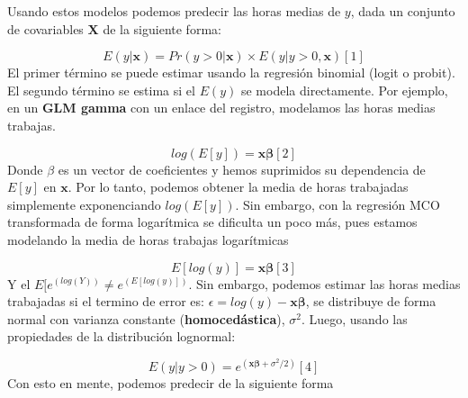 \documentclass[
  letterpaper,
  DIV=11,
  numbers=noendperiod]{scrreprt}
\begin{document}
Usando estos modelos podemos predecir las horas medias de \(y\), dada un
conjunto de covariables \(\mathbf{X}\) de la siguiente forma:

\[E(y|\mathbf{x})=Pr(y>0|\mathbf{x})\times E(y|y>0,\mathbf{x})[1]\] El
primer término se puede estimar usando la regresión binomial (logit o
probit). El segundo término se estima si el \(E(y)\) se modela
directamente. Por ejemplo, en un \textbf{GLM gamma} con un enlace del
registro, modelamos las horas medias trabajas.

\[log(E[y])=\mathbf{x\beta} [2]\] Donde \(\beta\) es un vector de
coeficientes y hemos suprimidos su dependencia de \(E[y]\) en
\(\mathbf{x}\). Por lo tanto, podemos obtener la media de horas
trabajadas simplemente exponenciando \(log(E[y])\). Sin embargo, con la
regresión MCO transformada de forma logarítmica se dificulta un poco
más, pues estamos modelando la media de horas trabajas logarítmicas

\[E[log(y)]=\mathbf{x\beta}[3]\] Y el
\(E[e^{(log(Y))}\neq e^{(E[log(y)])}\). Sin embargo, podemos estimar las
horas medias trabajadas si el termino de error es:
\(\epsilon=log(y)-\mathbf{x\beta}\), se distribuye de forma normal con
varianza constante (\textbf{homocedástica}), \(\sigma^2\). Luego, usando
las propiedades de la distribución lognormal:

\[E(y|y>0)=e^{(\mathbf{x\beta}+\sigma^2/2)} [4]\] Con esto en mente,
podemos predecir de la siguiente forma
\end{document}
